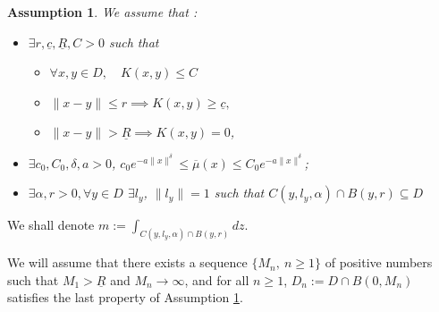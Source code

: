 \documentclass[notitlepage,reqno,11pt]{amsart}
\numberwithin{equation}{section}
\newtheorem{assumption}{Assumption}[section]
\begin{document}
\begin{assumption}
	\label{ass2}
	We assume that :
	\begin{itemize}
		\item $ \exists r, \underline{c}, \underline{R}, C>0$ such that
		\begin{itemize}
		\item[$i)$]$\forall x,y \in D, \quad K(x,y)\leq C$
		\item[$ii)$]$\|x-y\|\leq r\implies K(x,y)\geq \underline{c},$
		\item[$iii)$] $\|x-y\|> \underline{R}\implies K(x,y)=0$,
		\end{itemize} 
	\item $\exists c_0, C_0, \delta , a > 0$,  $c_0e^{-a\|x\|^{\delta}}\leq\overline \mu(x) \leq C_0e^{-a\|x\|^{\delta}}$;
	\item $\exists \alpha, r > 0, \forall y\in D$ $\exists l_y$, $\|l_y\|=1$ such that $C(y, l_y,\alpha)\cap B(y,r)\subseteq D$ 
			\end{itemize}
\end{assumption}
We shall denote $m:=\displaystyle \int_{C(y,l_y,\alpha)\cap B(y,r)}dz$.

We will assume that there exists a sequence $\{M_n,\ n\ge1\}$ of positive numbers such that $M_1>\underline{R}$ and $M_n\rightarrow \infty$, and for all $n\geq 1$, $D_n:=D\cap B(0,M_n)$ satisfies the last property of Assumption \ref{ass2}.
\end{document}
